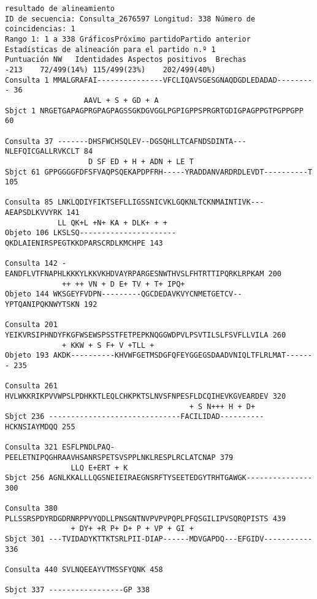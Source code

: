 \documentclass[fleqn,10pt]{article}
\begin{document}
\begin{lstlisting}[style=outputstyle,caption={Resultado detallado del alineamiento entre Secuencia 1 y Secuencia 2}]
resultado de alineamiento 
ID de secuencia: Consulta_2676597 Longitud: 338 Número de coincidencias: 1
Rango 1: 1 a 338 GráficosPróximo partidoPartido anterior
Estadísticas de alineación para el partido n.º 1
Puntuación NW	Identidades	Aspectos positivos	Brechas
-213	72/499(14%)	115/499(23%)	202/499(40%)
Consulta 1 MMALGRAFAI---------------VFCLIQAVSGESGNAQDGDLEDADAD--------- 36
                  AAVL + S + GD + A            
Sbjct 1 NRGETGAPAGPRGPAGPAGSSGKDGVGGLPGPIGPPSPRGRTGDIGPAGPPGTPGPPGPP 60

Consulta 37 -------DHSFWCHSQLEV--DGSQHLLTCAFNDSDINTA---NLEFQICGALLRVKCLT 84
                   D SF ED + H + ADN + LE T
Sbjct 61 GPPGGGGFDFSFVAQPSQEKAPDPFRH-----YRADDANVARDRDLEVDT----------T 105

Consulta 85 LNKLQDIYFIKTSEFLLIGSSNICVKLGQKNLTCKNMAINTIVK---AEAPSDLKVVYRK 141
            LL QK+L +N+ KA + DLK+ + +
Objeto 106 LKSLSQ----------------------QKDLAIENIRSPEGTKKDPARSCRDLKMCHPE 143

Consulta 142 -EANDFLVTFNAPHLKKKYLKKVKHDVAYRPARGESNWTHVSLFHTRTTIPQRKLRPKAM 200
             ++ ++ VN + D E+ TV + T+ IPQ+       
Objeto 144 WKSGEYFVDPN---------QGCDEDAVKVYCNMETGETCV--YPTQANIPQKNWYTSKN 192

Consulta 201 YEIKVRSIPHNDYFKGFWSEWSPSSTFETPEPKNQGGWDPVLPSVTILSLFSVFLLVILA 260
             + KKW + S F+ V +TLL +        
Objeto 193 AKDK----------KHVWFGETMSDGFQFEYGGEGSDAADVNIQLTFLRLMAT------- 235

Consulta 261 HVLWKKRIKPVVWPSLPDHKKTLEQLCHKPKTSLNVSFNPESFLDCQIHEVKGVEARDEV 320
                                          + S N+++ H + D+
Sbjct 236 ------------------------------FACILIDAD----------HCKNSIAYMDQQ 255

Consulta 321 ESFLPNDLPAQ-PEELETNIPQGHRAAVHSANRSPETSVSPPLNKLRESPLRCLATCNAP 379
               LLQ E+ERT + K               
Sbjct 256 AGNLKKALLLQGSNEIEIRAEGNSRFTYSEETEDGYTRHTGAWGK--------------- 300

Consulta 380 PLLSSRSPDYRDGDRNRPPVYQDLLPNSGNTNVPVPVPQPLPFQSGILIPVSQRQPISTS 439
               + DY+ +R P+ D+ P + VP + GI +           
Sbjct 301 ---TVIDADYKTTKTSRLPII-DIAP------MDVGAPDQ---EFGIDV----------- 336

Consulta 440 SVLNQEEAYVTMSSFYQNK 458
                               
Sbjct 337 -----------------GP 338
\end{lstlisting}
\end{document}

